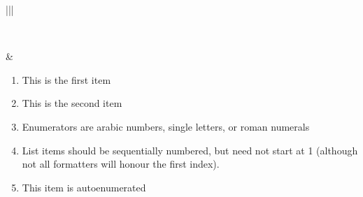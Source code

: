 \documentclass[letterpaper,10pt,english]{sphinxmanual}
\begin{document}
\begin{savenotes}
\begin{tabular}[t]{|*{2}{|}}
\begin{itemize}
\begin{itemize}
\end{itemize}

\end{itemize}
\\
\hline
\begin{sphinxVerbatimintable}[commandchars=\\\{\}]
     
     
    
       
     
         
       
      
\end{sphinxVerbatimintable}
&\begin{enumerate}
%
\setcounter{enumi}{2}
\item {} 
This is the first item

\item {} 
This is the second item

\item {} 
Enumerators are arabic numbers,
single letters, or roman numerals

\item {} 
List items should be sequentially
numbered, but need not start at 1
(although not all formatters will
honour the first index).

\item {} 
This item is auto\sphinxhyphen{}enumerated

\end{enumerate}
\\
\hline
\begin{sphinxVerbatimintable}[commandchars=\\\{\}]
       
   


\end{sphinxVerbatimintable}
\end{tabular}
\end{savenotes}
\end{document}
